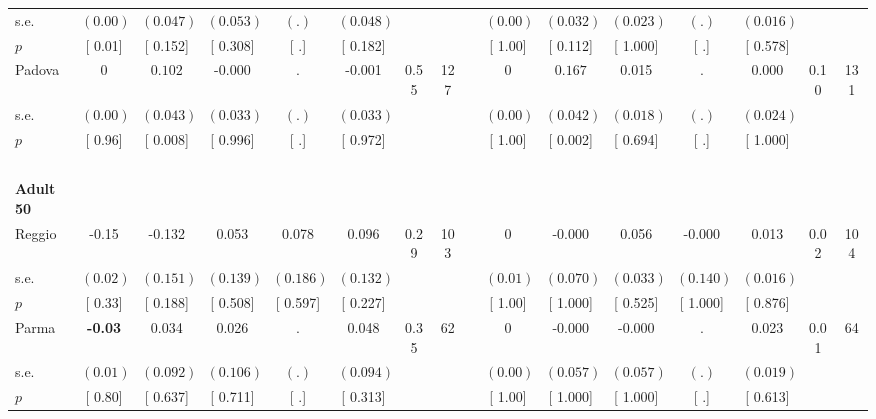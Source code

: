 \begin{longtable}{L{8em} c c c c c c c p{1em} c c c c c c c}
\quad \quad \quad \quad s.e.& $ (     0.00)$ & $ (    0.047)$ & $ (    0.053)$ & $ (        .)$ & $ (    0.048)$ & & & & $ (     0.00)$ & $ (    0.032)$ & $ (    0.023)$ & $ (        .)$ & $ (    0.016)$ & &  \\*
\quad \quad \quad \quad $ p$ & [     0.01] & [    0.152] & [    0.308] & [        .] & [    0.182] & & & & [     1.00] & [    0.112] & [    1.000] & [        .] & [    0.578] & &  \\[1em]
\quad \quad \quad Padova& 0 & $ \mathbf{    0.102}$ &    -0.000 &         . &    -0.001 &      0.55 &       127 & & 0 & $ \mathbf{    0.167}$ &     0.015 &         . &     0.000 &      0.10 &       131  \\*
\quad \quad \quad \quad s.e.& $ (     0.00)$ & $ (    0.043)$ & $ (    0.033)$ & $ (        .)$ & $ (    0.033)$ & & & & $ (     0.00)$ & $ (    0.042)$ & $ (    0.018)$ & $ (        .)$ & $ (    0.024)$ & &  \\*
\quad \quad \quad \quad $ p$ & [     0.96] & [    0.008] & [    0.996] & [        .] & [    0.972] & & & & [     1.00] & [    0.002] & [    0.694] & [        .] & [    1.000] & &  \\[1em]
~\\[1em]
\quad \quad \textbf{Adult 50} & & & & & & & & & & & & & & & \\* 
\quad \quad \quad Reggio& -0.15 &    -0.132 &     0.053 &     0.078 &     0.096 &      0.29 &       103 & & 0 &    -0.000 &     0.056 &    -0.000 &     0.013 &      0.02 &       104  \\*
\quad \quad \quad \quad s.e.& $ (     0.02)$ & $ (    0.151)$ & $ (    0.139)$ & $ (    0.186)$ & $ (    0.132)$ & & & & $ (     0.01)$ & $ (    0.070)$ & $ (    0.033)$ & $ (    0.140)$ & $ (    0.016)$ & &  \\*
\quad \quad \quad \quad $ p$ & [     0.33] & [    0.188] & [    0.508] & [    0.597] & [    0.227] & & & & [     1.00] & [    1.000] & [    0.525] & [    1.000] & [    0.876] & &  \\[1em]
\quad \quad \quad Parma& \textbf{    -0.03} &     0.034 &     0.026 &         . &     0.048 &      0.35 &        62 & & 0 &    -0.000 &    -0.000 &         . &     0.023 &      0.01 &        64  \\*
\quad \quad \quad \quad s.e.& $ (     0.01)$ & $ (    0.092)$ & $ (    0.106)$ & $ (        .)$ & $ (    0.094)$ & & & & $ (     0.00)$ & $ (    0.057)$ & $ (    0.057)$ & $ (        .)$ & $ (    0.019)$ & &  \\*
\quad \quad \quad \quad $ p$ & [     0.80] & [    0.637] & [    0.711] & [        .] & [    0.313] & & & & [     1.00] & [    1.000] & [    1.000] & [        .] & [    0.613] & &  \\[1em]

\end{longtable}
